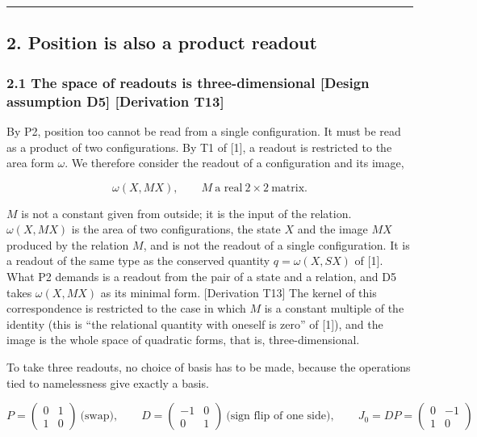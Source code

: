 \documentclass[
  a4paper,
]{article}
\begin{document}
\begin{center}\rule{0.5\linewidth}{0.5pt}\end{center}

\subsection{2. Position is also a product
readout}\label{position-is-also-a-product-readout}

\subsubsection{2.1 The space of readouts is three-dimensional {[}Design
assumption D5{]} {[}Derivation
T13{]}}\label{the-space-of-readouts-is-three-dimensional-design-assumption-d5-derivation-t13}

By P2, position too cannot be read from a single configuration. It must
be read as a product of two configurations. By T1 of {[}1{]}, a readout
is restricted to the area form \(\omega\). We therefore consider the
readout of a configuration and its image,

\[
\omega(X,MX),\qquad M\ \text{a real}\ 2\times2\ \text{matrix}.
\]

\(M\) is not a constant given from outside; it is the input of the
relation. \(\omega(X,MX)\) is the area of two configurations, the state
\(X\) and the image \(MX\) produced by the relation \(M\), and is not
the readout of a single configuration. It is a readout of the same type
as the conserved quantity \(q=\omega(X,SX)\) of {[}1{]}. What P2 demands
is a readout from the pair of a state and a relation, and D5 takes
\(\omega(X,MX)\) as its minimal form. {[}Derivation T13{]} The kernel of
this correspondence is restricted to the case in which \(M\) is a
constant multiple of the identity (this is ``the relational quantity
with oneself is zero'' of {[}1{]}), and the image is the whole space of
quadratic forms, that is, three-dimensional.

To take three readouts, no choice of basis has to be made, because the
operations tied to namelessness give exactly a basis.

\[
P=\begin{pmatrix}0&1\\1&0\end{pmatrix}\ \text{(swap)},\qquad
D=\begin{pmatrix}-1&0\\0&1\end{pmatrix}\ \text{(sign flip of one side)},\qquad
J_0=DP=\begin{pmatrix}0&-1\\1&0\end{pmatrix}
\]
\end{document}

